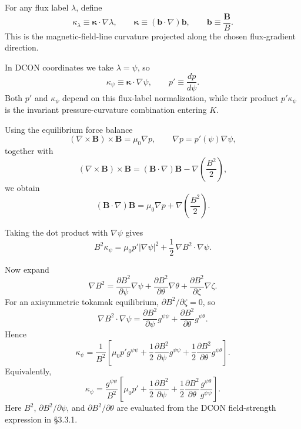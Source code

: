 \documentclass[10pt,a4paper]{article}
\numberwithin{equation}{section}
\begin{document}
\color{blue}
For any flux label $\lambda$, define
\begin{equation}
\kappa_\lambda
\equiv
\boldsymbol{\kappa}\cdot\nabla\lambda,
\qquad
\boldsymbol{\kappa}\equiv(\mathbf b\cdot\nabla)\mathbf b,
\qquad
\mathbf b\equiv\frac{\mathbf B}{B}.
\end{equation}
This is the magnetic-field-line curvature projected along the chosen flux-gradient
direction.

\color{black}
In DCON coordinates we take $\lambda=\psi$, so
\begin{equation}
\kappa_\psi\equiv\boldsymbol{\kappa}\cdot\nabla\psi,
\qquad
p'\equiv\frac{dp}{d\psi}.
\end{equation}
Both $p'$ and $\kappa_\psi$ depend on this flux-label normalization, while their product
$p'\kappa_\psi$ is the invariant pressure-curvature combination entering $K$.

Using the equilibrium force balance
\begin{equation}
(\nabla\times\mathbf B)\times\mathbf B
=
\mu_0\nabla p,
\qquad
\nabla p = p'(\psi)\nabla\psi,
\end{equation}
together with
\begin{equation}
(\nabla\times\mathbf B)\times\mathbf B
=
(\mathbf B\cdot\nabla)\mathbf B
-
\nabla\left(\frac{B^2}{2}\right),
\end{equation}
we obtain
\begin{equation}
(\mathbf B\cdot\nabla)\mathbf B
=
\mu_0\nabla p
+
\nabla\left(\frac{B^2}{2}\right).
\end{equation}

Taking the dot product with $\nabla\psi$ gives
\begin{equation}
B^2\kappa_\psi
=
\mu_0 p' |\nabla\psi|^2
+
\frac{1}{2}\,\nabla B^2\cdot\nabla\psi.
\end{equation}

Now expand
\begin{equation}
\nabla B^2
=
\frac{\partial B^2}{\partial\psi}\nabla\psi
+
\frac{\partial B^2}{\partial\theta}\nabla\theta
+
\frac{\partial B^2}{\partial\zeta}\nabla\zeta.
\end{equation}
For an axisymmetric tokamak equilibrium, $\partial B^2/\partial\zeta=0$, so
\begin{equation}
\nabla B^2\cdot\nabla\psi
=
\frac{\partial B^2}{\partial\psi}g^{\psi\psi}
+
\frac{\partial B^2}{\partial\theta}g^{\psi\theta}.
\end{equation}
Hence
\begin{equation}
\boxed{
\kappa_\psi
=
\frac{1}{B^2}
\left[
\mu_0 p' g^{\psi\psi}
+
\frac{1}{2}\frac{\partial B^2}{\partial\psi}g^{\psi\psi}
+
\frac{1}{2}\frac{\partial B^2}{\partial\theta}g^{\psi\theta}
\right].
}
\end{equation}
Equivalently,
\begin{equation}
\boxed{
\kappa_\psi
=
\frac{g^{\psi\psi}}{B^2}
\left[
\mu_0 p'
+
\frac{1}{2}\frac{\partial B^2}{\partial\psi}
+
\frac{1}{2}\frac{\partial B^2}{\partial\theta}
\frac{g^{\psi\theta}}{g^{\psi\psi}}
\right].
}
\end{equation}
Here $B^2$, $\partial B^2/\partial\psi$, and $\partial B^2/\partial\theta$ are evaluated
from the DCON field-strength expression in §3.3.1.
\end{document}
